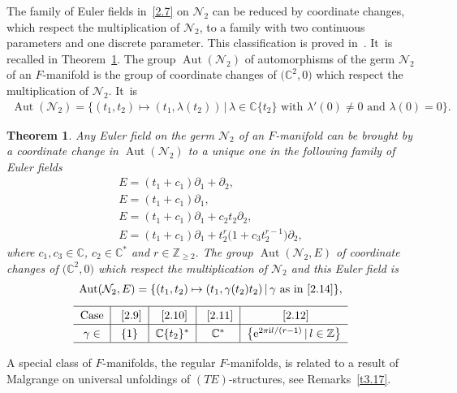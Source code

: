 \documentclass[10pt,a4paper]{amsart}
\numberwithin{equation}{section}
\numberwithin{figure}{section}
\newcommand{\Z}{{\mathbb Z}}
\newcommand{\C}{{\mathbb C}}
\newcommand{\NN}{{\mathcal N}}
\newcommand{\paa}{\partial}
\DeclareMathOperator{\Aut}{Aut}
\newtheorem{Theorem}{Theorem}[section]
\begin{document}
The family of Euler fields in~\eqref{2.7} on $\NN_2$
can be reduced by coordinate changes, which respect the
multiplication of $\NN_2$, to a family
with two continuous parameters and one discrete parameter.
This classification is proved in~\cite{DH20-3}. It~is recalled
in Theorem~\ref{t2.3}.
The group $\Aut(\NN_2)$ of automorphisms of the germ
$\NN_2$ of an $F$-manifold is the group of coordinate
changes of $\big(\C^2,0\big)$ which respect the multiplication
of $\NN_2$. It~is
\begin{gather*}%
\Aut(\NN_2)=\{(t_1,t_2)\mapsto(t_1,\lambda(t_2))\,|\,
\lambda\in \C\{t_2\}\text{ with }\lambda'(0)\neq 0\text{ and }\lambda(0)=0\}.
\end{gather*}

\begin{Theorem}\label{t2.3}
Any Euler field on the germ $\NN_2$ of an $F$-manifold
can be brought by a coordinate change in $\Aut(\NN_2)$
to a unique one in the following family of Euler fields
\begin{gather}\label{2.9}
E = (t_{1} + c_1) \paa_{1} +\paa_{2},
\\
E = (t_{1}+c_1) \paa_{1},\label{2.10}
\\
E = (t_{1}+c_1) \paa_{1} +{c}_2 t_{2}\paa_{2},\label{2.11}
\\
E = (t_{1}+c_1) \paa_{1} + t_{2}^{r}\big(1 + c_3 t_{2}^{r-1}\big)\paa_{2},\label{2.12}
\end{gather}
where $c_1, c_3\in \C$, $c_2\in \C^*$ and $r\in
\Z_{\geq 2}.$
The group $\Aut(\NN_2,E)$ of coordinate changes of
$\big(\C^2,0\big)$ which respect the multiplication of $\NN_2$
and this Euler field is
\begin{gather}%
\Aut(\NN_2,E)=\{(t_1,t_2)\mapsto (t_1,\gamma(t_2)t_2)\,|\,
\gamma\text{ as in~\eqref{2.14}}\},\nonumber
\\[1ex]
\def\arraystretch{1.3}
\begin{tabular}{c|c|c|c|c}
\hline
\text{Case} &~\eqref{2.9} &~\eqref{2.10} &~\eqref{2.11}&~\eqref{2.12}
\\ \hline
$\gamma\in$ & \{1\} & $\C\{t_2\}^*$ & $\C^*$
&$\big\{{\rm e}^{2\pi {\rm i} l/(r-1)}\,|\, l\in\Z \big\}$\label{2.14}
\\
\hline
\end{tabular}
\end{gather}
\end{Theorem}



A special class of $F$-manifolds, the regular $F$-manifolds,
is related to a result of Malgrange on universal unfoldings
of $(TE)$-structures, see Remarks~\ref{t3.17}.
\end{document}

